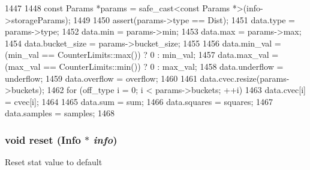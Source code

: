 \begin{DoxyCode}
1447     {
1448         const Params *params = safe_cast<const Params *>(info->storageParams);
1449 
1450         assert(params->type == Dist);
1451         data.type = params->type;
1452         data.min = params->min;
1453         data.max = params->max;
1454         data.bucket_size = params->bucket_size;
1455 
1456         data.min_val = (min_val == CounterLimits::max()) ? 0 : min_val;
1457         data.max_val = (max_val == CounterLimits::min()) ? 0 : max_val;
1458         data.underflow = underflow;
1459         data.overflow = overflow;
1460 
1461         data.cvec.resize(params->buckets);
1462         for (off_type i = 0; i < params->buckets; ++i)
1463             data.cvec[i] = cvec[i];
1464 
1465         data.sum = sum;
1466         data.squares = squares;
1467         data.samples = samples;
1468     }
\end{DoxyCode}
\hypertarget{classStats_1_1DistStor_a10d9d71be6e0d2194999bb5dd5280e2d}{
\subsubsection[{reset}]{\setlength{\rightskip}{0pt plus 5cm}void reset ({\bf Info} $\ast$ {\em info})}}
\label{classStats_1_1DistStor_a10d9d71be6e0d2194999bb5dd5280e2d}
Reset stat value to default 


